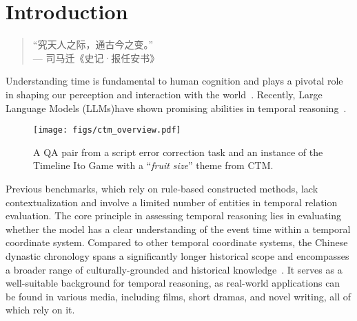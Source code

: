 \section{Introduction}
\begin{quote}
``究天人之际，通古今之变。''\\
\hspace*{\fill}--- 司马迁《史记·报任安书》
\end{quote}
Understanding time is fundamental to human cognition and plays a pivotal role in shaping our perception and interaction with the world~\cite{islakoglu2025chronosense}.
Recently, Large Language Models (LLMs)have shown promising abilities in temporal reasoning~\citep{chu-etal-2024-timebench,su-etal-2024-living}.
\begin{figure}[t]
    \centering
    \texttt{[image: figs/ctm\_overview.pdf]}
    \caption{A QA pair from a script error correction task and an instance of the Timeline Ito Game with a ``\textit{fruit size}'' theme from CTM.
    \protect\footnotemark
    }
    \label{fig:intro}
\end{figure}
Previous benchmarks, which rely on rule-based constructed methods, lack contextualization and involve a limited number of entities in temporal relation evaluation.
The core principle in assessing temporal reasoning lies in evaluating whether the model has a clear understanding of the event time within a temporal coordinate system. 
Compared to other temporal coordinate systems, the Chinese dynastic chronology spans a significantly longer historical scope and encompasses a broader range of culturally-grounded and historical knowledge~\citep{sun-etal-2024-benchmarking-chinese, li-etal-2024-foodieqa, yuan2024cultural, lu2024benchmarking}.
It serves as a well-suitable background for temporal reasoning, as real-world applications can be found in various media, including films, short dramas, and novel writing, all of which rely on it.


